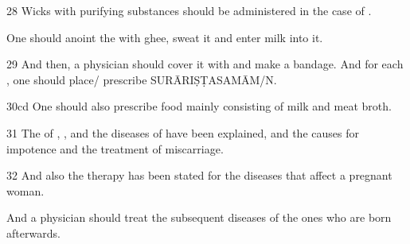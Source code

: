 \begin{translation}
\item [28]
Wicks with purifying substances should be administered in the case of .

One should anoint the  with ghee, sweat it and enter milk 
into it. 

\item [29] 
And then, a physician should cover it with  and make a bandage. 
And for each , one should place/ prescribe 
SURĀRIṢṬASAMĀM/N.

\item [30cd]
One should also prescribe food mainly consisting of milk and meat broth.

\item [31]
The  of , , 
 and the diseases of  have been explained, and the causes for impotence and the treatment of miscarriage. 

\item [32] 
And also the therapy has been stated for the diseases that affect a pregnant woman.

And a physician should treat the subsequent diseases of the ones who are born afterwards.

\end{translation}
